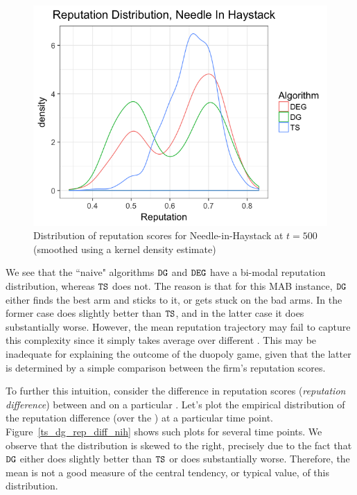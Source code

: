 \documentclass[../competing_bandits_with_appendix.tex]{subfiles}
\begin{document}
\begin{figure}[ht]
\includegraphics[scale=0.35]{figures/rep_distribution_nih}
\caption{Distribution of reputation scores for Needle-in-Haystack at $t=500$ (smoothed using a kernel density estimate)}
\label{rep_dist_nih}
\end{figure}


We see that the ``naive" algorithms $\mathtt{DG}$ and $\mathtt{DEG}$ have a bi-modal reputation distribution, whereas $\mathtt{TS}$ does not. The reason is that for this MAB instance, $\mathtt{DG}$ either finds the best arm and sticks to it, or gets stuck on the bad arms. In the former case \DG does slightly better than $\mathtt{TS}$, and in the latter case it does substantially worse. However, the mean reputation trajectory may fail to capture this complexity since it simply takes average over different \MRVs. This may be inadequate for explaining the outcome of the duopoly game, given that the latter is determined by a simple comparison between the firm's reputation scores. 

To further this intuition, consider the difference in reputation scores (\emph{reputation difference}) between \TS and \DG on a particular \MRV. Let's plot the empirical distribution of the reputation difference (over the \MRVs) at a particular time point. Figure~\ref{ts_dg_rep_diff_nih} shows such plots for several time points. We observe that the distribution is skewed to the right, precisely due to the fact that $\mathtt{DG}$ either does slightly better than $\mathtt{TS}$ or does substantially worse. Therefore, the mean is not a good measure of the central tendency, or typical value, of this distribution. 
\end{document}
